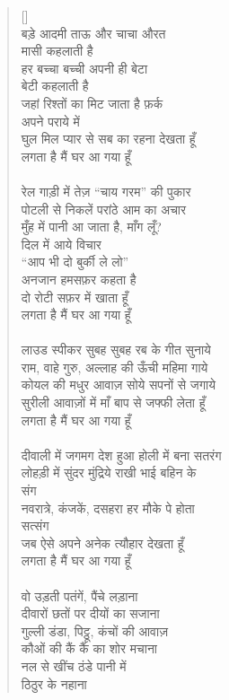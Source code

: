 \begin{verse}[\versewidth]
{\\
बड़े आदमी ताऊ और चाचा औरत\\
 मासी कहलाती है\\
हर बच्चा बच्ची अपनी ही बेटा \\
बेटी कहलाती है\\
जहां रिश्तों का मिट जाता है फ़र्क \\
अपने पराये में\\
 घुल मिल प्यार से सब का रहना देखता हूँ\\
लगता है मैं घर आ गया हूँ\\
\\
रेल गाड़ी में तेज़ “चाय गरम” की पुकार\\
पोटली से निकलें परांठे आम का अचार\\
मुँह में पानी आ जाता है, माँग लूँ?\\
दिल में आये विचार\\
“आप भी दो बुर्की ले लो”\\
अनजान हमसफ़र कहता है\\
दो रोटी सफ़र में खाता हूँ\\
लगता है मैं घर आ गया हूँ\\
\\
लाउड स्पीकर सुबह सुबह रब के गीत सुनाये\\
राम, वाहे गुरु, अल्लाह की ऊँची महिमा गाये\\
कोयल की मधुर आवाज़ सोये सपनों से जगाये\\
सुरीली आवाज़ों में माँ बाप से जफ्फी लेता हूँ\\
लगता है मैं घर आ गया हूँ\\
\\
दीवाली में जगमग देश हुआ होली में बना सतरंग\\
लोहड़ी में सुंदर मुंद्रिये राखी भाई बहिन के\\
संग\\
नवरात्रे, कंजकें, दसहरा हर मौके पे होता\\
सत्संग\\
जब ऐसे अपने अनेक त्यौहार देखता हूँ\\
लगता है मैं घर आ गया हूँ\\
\\
वो उड़ती पतंगें, पैंचे लड़ाना\\
दीवारों छतों पर दीयों का सजाना\\
गुल्ली डंडा, पिट्ठू, कंचों की आवाज़\\
कौओं की कैं कैं का शोर मचाना\\
नल से खींच ठंडे पानी में\\
ठिठुर के नहाना\\
}
\end{verse}
